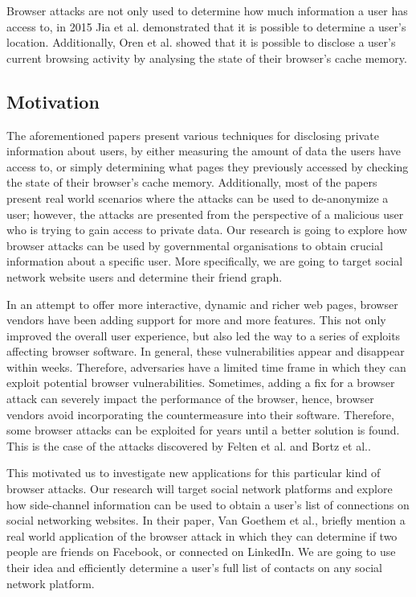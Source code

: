 \documentclass[a4paper,11pt]{article}
\begin{document}
Browser attacks are not only used to determine how much information a user has access to, in 2015 Jia et al.\cite{jia2015know} demonstrated that it is possible to determine a user's location. Additionally, Oren et al.\cite{oren2015spy} showed that it is possible to disclose a user's current browsing activity by analysing the state of their browser's cache memory. 

\subsection*{Motivation}

The aforementioned papers present various techniques for disclosing private information about users, by either measuring the amount of data the users have access to, or simply determining what pages they previously accessed by checking the state of their browser's cache memory. Additionally, most of the papers present real world scenarios where the attacks can be used to de-anonymize a user; however, the attacks are presented from the perspective of a malicious user who is trying to gain access to private data. Our research is going to explore how browser attacks can be used by governmental organisations to obtain crucial information about a specific user. More specifically, we are going to target social network website users and determine their friend graph.

In an attempt to offer more interactive, dynamic and richer web pages, browser vendors have been adding support for more and more features. 
This not only improved the overall user experience, but also led the way to a series of exploits affecting browser software. In general, these vulnerabilities appear and disappear within weeks. Therefore, adversaries have a limited time frame in which they can exploit potential browser vulnerabilities. Sometimes, adding a fix for a browser attack can severely impact the performance of the browser, hence, browser vendors avoid incorporating the countermeasure into their software. Therefore, some browser attacks can be exploited for years until a better solution is found. This is the case of the attacks discovered by Felten et al.\cite{felten2000timing} and Bortz et al.\cite{bortz2007exposing}.

This motivated us to investigate new applications for this particular kind of browser attacks. Our research will target social network platforms and explore how side-channel information can be used to obtain a user's list of connections on social networking websites. In their paper, Van Goethem et al.\cite{van2015clock}, briefly mention a real world application of the browser attack in which they can determine if two people are friends on Facebook, or connected on LinkedIn. We are going to use their idea and efficiently determine a user's full list of contacts on any social network platform. 
\end{document}
